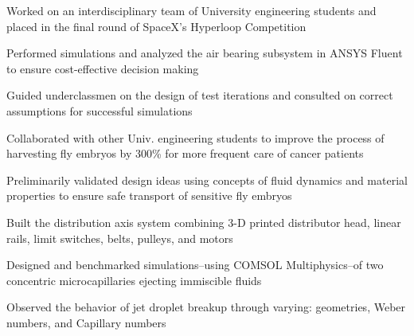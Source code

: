 \documentclass[]{deedy-resume-openfont}
\begin{document}
\begin{minipage}[t]{0.66\textwidth}
\begin{tightemize}
\item Worked on an interdisciplinary team of University engineering students and placed in the final round of SpaceX's Hyperloop Competition
\item Performed simulations and analyzed the air bearing subsystem in ANSYS Fluent to ensure cost-effective decision making
\item Guided underclassmen on the design of test iterations and consulted on correct assumptions for successful simulations
\end{tightemize}
\sectionsep

\begin{tightemize}
\item Collaborated with other Univ. engineering students to improve the process of harvesting fly embryos by 300{\% }for more frequent care of cancer patients
\item Preliminarily validated design ideas using concepts of fluid dynamics and material properties to ensure safe transport of sensitive fly embryos
\item Built the distribution axis system combining 3-D printed distributor head, linear rails, limit switches, belts, pulleys, and motors
\end{tightemize}
\sectionsep

\begin{tightemize}
\item Designed and benchmarked simulations--using COMSOL Multiphysics--of two concentric microcapillaries ejecting immiscible fluids
\item Observed the behavior of jet droplet breakup through varying: geometries, Weber numbers, and Capillary numbers
\end{tightemize}
\sectionsep


\end{minipage} 
\end{document}
